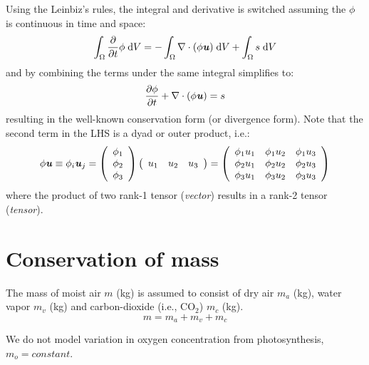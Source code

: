 Using the Leinbiz's rules, the integral and derivative is switched assuming the $\phi$ is continuous in time and space:
\begin{equation}
\int_{\Omega}  \frac{\partial}{\partial t}\phi\;\mathrm{d}V = -\int_{\Omega} \nabla \cdot (\phi\textbf{\textit{u}})\;\mathrm{d}V + \int_{\Omega} s\;\mathrm{d}V
\end{equation}
and by combining the terms under the same integral simplifies to:
\begin{equation}
\frac{\partial \phi}{\partial t} + \nabla \cdot (\phi\textbf{\textit{u}}) = s
\end{equation}
resulting in the well-known conservation form (or divergence form). Note that the second term in the LHS is a dyad or outer product, i.e.:
\begin{equation}
\phi {\mvec{u}} \equiv {\phi _i}{\mvec{u}_j} = \left( {\begin{array}{*{20}{c}}
{{\phi _1}}\\
{{\phi _2}}\\
{{\phi _3}}
\end{array}} \right)\left( {\begin{array}{*{20}{c}}
{{u_1}}&{{u_2}}&{{u_3}}
\end{array}} \right) = \left( {\begin{array}{*{20}{c}}
{{\phi _1}{u_1}}&{{\phi _1}{u_2}}&{{\phi _1}{u_3}}\\
{{\phi _2}{u_1}}&{{\phi _2}{u_2}}&{{\phi _2}{u_3}}\\
{{\phi _3}{u_1}}&{{\phi _3}{u_2}}&{{\phi _3}{u_3}}
\end{array}} \right)
\end{equation}
where the product of two rank-1 tensor (\textit{vector}) results in a rank-2 tensor (\textit{tensor}).

\newpage

\section{Conservation of mass}
\label{sec:conservationofmass}

The mass of moist air $m$ (kg) is assumed to consist of dry air $m_a$ (kg), water vapor $m_v$ (kg) and carbon-dioxide (i.e., CO$_2$) $m_{c}$ (kg).
\begin{equation}
m = m_a + m_v + m_{c}
\end{equation}

\begin{assumption}
	We do not model variation in oxygen concentration from photosynthesis, $m_o = \textit{constant}$.
\end{assumption}

